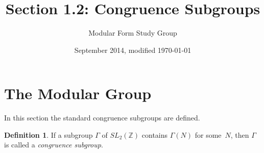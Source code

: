 \documentclass{article}
\theoremstyle{plain}
\theoremstyle{definition}
\newtheorem{definition}[theorem]{Definition}
\theoremstyle{remark}
\newcommand{\Z}{\mathbb{Z}}
\begin{document}
 

\title{Section 1.2: Congruence Subgroups}

\author{Modular Form Study Group}

\date{September 2014, modified \today}

\maketitle


\section{The Modular Group}

In this section the standard congruence subgroups are defined.

\begin{definition}
If a subgroup $\Gamma$ of $SL_2(\Z)$ contains
$\Gamma(N)$ for some~$N$, then $\Gamma$ is called a \emph{congruence subgroup}.
\end{definition}
\end{document}
